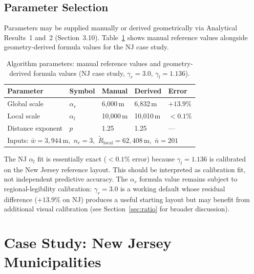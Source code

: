 \documentclass[12pt, a4paper]{article}
\numberwithin{equation}{section}
\begin{document}
\subsection{Parameter Selection}

Parameters may be supplied manually or derived geometrically via Analytical Results~1 and~2 (Section~3.10). Table~\ref{tab:params} shows manual reference values alongside geometry-derived formula values for the NJ case study.

\begin{table}[h]
\centering
\caption{Algorithm parameters: manual reference values and geometry-derived formula values (NJ case study, $\gamma_r = 3.0$, $\gamma_l = 1.136$).}
\label{tab:params}
\begin{tabular}{lllll}
\toprule
\textbf{Parameter} & \textbf{Symbol} & \textbf{Manual} & \textbf{Derived} & \textbf{Error} \\
\midrule
Global scale      & $\alpha_r$ & 6{,}000\,m  & 6{,}832\,m  & $+13.9\%$ \\
Local scale       & $\alpha_l$ & 10{,}000\,m & 10{,}010\,m & $<0.1\%$ \\
Distance exponent & $p$        & 1.25        & 1.25        & ---       \\
\midrule
\multicolumn{5}{l}{\small Inputs: $\bar{w}=3{,}944$\,m,\ $n_r=3$,\ $\widetilde{R}_{\text{local}}=62{,}408$\,m,\ $\bar{n}=201$} \\
\bottomrule
\end{tabular}
\end{table}

\noindent The NJ $\alpha_l$ fit is essentially exact ($<0.1\%$ error) because $\gamma_l = 1.136$ is calibrated on the New Jersey reference layout. This should be interpreted as calibration fit, not independent predictive accuracy. The $\alpha_r$ formula value remains subject to regional-legibility calibration: $\gamma_r = 3.0$ is a working default whose residual difference ($+13.9\%$ on NJ) produces a useful starting layout but may benefit from additional visual calibration (see Section~\ref{sec:ratio} for broader discussion).

\section{Case Study: New Jersey Municipalities}
\end{document}
